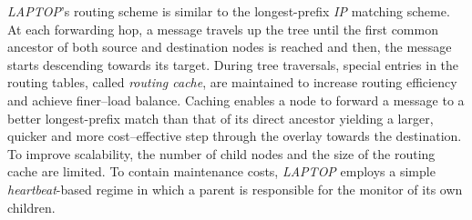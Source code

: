 \emph{LAPTOP}'s routing scheme is similar to the 
longest-prefix \emph{IP} matching scheme. 
At each forwarding hop, a message travels up the tree 
until the first common ancestor of both source and destination nodes 
is reached and then, the message starts descending towards its target. 
During tree traversals, special entries in the routing tables, 
called \emph{routing cache}, 
are maintained to increase routing efficiency and achieve finer--load balance. 
Caching enables a node to forward a message to a better 
longest-prefix match than that of its direct ancestor yielding
a larger, quicker and more cost--effective step through the overlay towards
the destination. 
To improve scalability, the number of child nodes and the
size of the routing cache are limited. 
To contain maintenance costs, \emph{LAPTOP} employs 
a simple \emph{heartbeat}-based regime in which 
a parent is responsible for the monitor of its own children.
%
%
%
